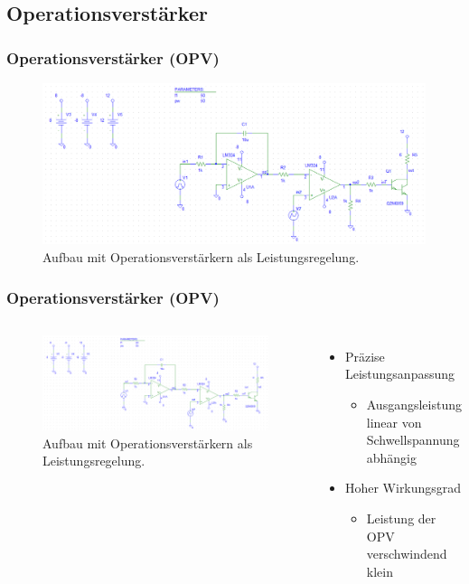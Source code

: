 \documentclass{beamer}
\begin{document}
	\subsection{Operationsverstärker}
	\begin{frame}
		\frametitle{Operationsverstärker (OPV)}
		\begin{center}
			\begin{figure}[tbh]
				\centering
				\includegraphics[width=0.95\linewidth , trim={10cm 0 0 0}]{medien/V2-0.png}
				\caption[Zweiter Aufbau]{Aufbau mit Operationsverstärkern als Leistungsregelung.}
				\label{fig:aufbau2}
			\end{figure}
		\end{center}
	\end{frame}
	\begin{frame}
		\frametitle{Operationsverstärker (OPV)}
		\begin{columns}
			\column{0.5\textwidth}
			\begin{figure}[tbh]
				\centering
				\includegraphics[width=1\linewidth , trim={10cm 0 0 0}]{medien/V2-0.png}
				\caption[Zweiter Aufbau]{Aufbau mit Operationsverstärkern als Leistungsregelung.}
			\end{figure}
			\column{0.5\textwidth}
			\begin{itemize}
				\item{Präzise Leistungsanpassung}
				\begin{itemize}
					\item{Ausgangsleistung linear von Schwellspannung abhängig}
				\end{itemize}
				\item{Hoher Wirkungsgrad}
				\begin{itemize}
					\item{Leistung der OPV verschwindend klein}
				\end{itemize}
			\end{itemize}
		\end{columns}
	\end{frame}
\end{document}
